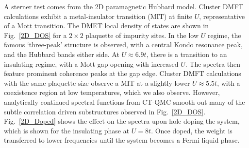 \documentclass[aps,twocolumn,nobibnotes]{revtex4}
\begin{document}
A sterner test comes from the 2D paramagnetic Hubbard model. Cluster DMFT calculations exhibit a metal-insulator transition (MIT)
at finite $U$, representative of a Mott transition\cite{Georges1996,Kotliar2008,Millis2012,Millis2013}.
The DMET local density of
states are shown in Fig.~\ref{2D_DOS} for a $2 \times 2$ plaquette of impurity sites. In the low $U$ regime, the famous `three-peak' structure 
is observed, with a central Kondo resonance peak, and the Hubbard bands either side. At $U \approx 6.9t$, there is a transition to an insulating 
regime, with a Mott gap opening with increased $U$. The spectra then feature prominent coherence peaks at the gap edge\cite{Kotliar2008}.
Cluster DMFT calculations with the same plaquette size observe a MIT at a slightly lower $U\approx5.5t$, 
with a coexistence region at low temperatures, which we also observe. However, analytically continued
spectral functions from CT-QMC smooth out many of the subtle correlation driven substructures observed in Fig.~\ref{2D_DOS}. 
Fig.~\ref{2D_Doped} shows the effect on the 
spectra upon hole doping the system, which is shown for the insulating phase at $U=8t$. Once doped, the weight is transferred to lower frequencies
until the system becomes a Fermi liquid phase\cite{Masatoshi2009}. 
\end{document}
